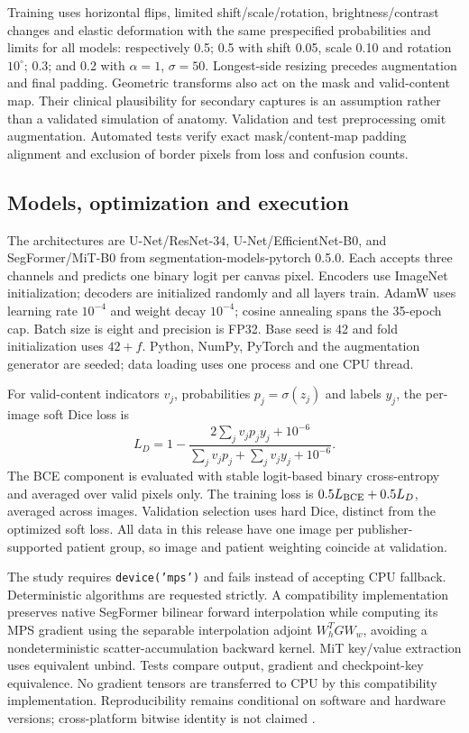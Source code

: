 \documentclass[11pt]{article}
\begin{document}
Training uses horizontal flips, limited shift/scale/rotation, brightness/contrast changes and elastic deformation with the same prespecified probabilities and limits for all models: respectively 0.5; 0.5 with shift 0.05, scale 0.10 and rotation $10^\circ$; 0.3; and 0.2 with $\alpha=1$, $\sigma=50$. Longest-side resizing precedes augmentation and final padding. Geometric transforms also act on the mask and valid-content map. Their clinical plausibility for secondary captures is an assumption rather than a validated simulation of anatomy. Validation and test preprocessing omit augmentation. Automated tests verify exact mask/content-map padding alignment and exclusion of border pixels from loss and confusion counts.

\subsection{Models, optimization and execution}
The architectures are U-Net/ResNet-34, U-Net/EfficientNet-B0, and SegFormer/MiT-B0 from segmentation-models-pytorch 0.5.0. Each accepts three channels and predicts one binary logit per canvas pixel. Encoders use ImageNet initialization; decoders are initialized randomly and all layers train. AdamW uses learning rate $10^{-4}$ and weight decay $10^{-4}$; cosine annealing spans the 35-epoch cap. Batch size is eight and precision is FP32. Base seed is 42 and fold initialization uses $42+f$. Python, NumPy, PyTorch and the augmentation generator are seeded; data loading uses one process and one CPU thread.

For valid-content indicators $v_j$, probabilities $p_j=\sigma(z_j)$ and labels $y_j$, the per-image soft Dice loss is
\[
L_D=1-\frac{2\sum_j v_jp_jy_j+10^{-6}}{\sum_jv_jp_j+\sum_jv_jy_j+10^{-6}}.
\]
The BCE component is evaluated with stable logit-based binary cross-entropy and averaged over valid pixels only. The training loss is $0.5L_{\rm BCE}+0.5L_D$, averaged across images. Validation selection uses hard Dice, distinct from the optimized soft loss. All data in this release have one image per publisher-supported patient group, so image and patient weighting coincide at validation.

The study requires \texttt{device('mps')} and fails instead of accepting CPU fallback. Deterministic algorithms are requested strictly. A compatibility implementation preserves native SegFormer bilinear forward interpolation while computing its MPS gradient using the separable interpolation adjoint $W_h^T G W_w$, avoiding a nondeterministic scatter-accumulation backward kernel. MiT key/value extraction uses equivalent unbind. Tests compare output, gradient and checkpoint-key equivalence. No gradient tensors are transferred to CPU by this compatibility implementation. Reproducibility remains conditional on software and hardware versions; cross-platform bitwise identity is not claimed \cite{torch}.
\end{document}
